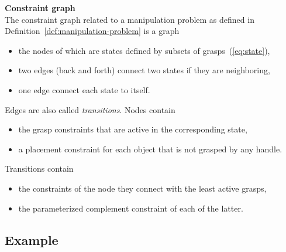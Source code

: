 \begin{definition}\label{def:constraint-graph}\textbf{Constraint graph}\\
  The constraint graph related to a manipulation problem as defined in Definition~\ref{def:manipulation-problem} is a graph
  \begin{itemize}
  \item the nodes of which are states defined by subsets of grasps~(\ref{eq:state}),
  \item two edges (back and forth) connect two states if they are neighboring,
  \item one edge connect each state to itself.
  \end{itemize}
  Edges are also called \textit{transitions}.
  Nodes contain
  \begin{itemize}
  \item the grasp constraints that are active in the corresponding state,
  \item a placement constraint for each object that is not grasped by any handle.
  \end{itemize}
  Transitions contain
  \begin{itemize}
  \item the constraints of the node they connect with the least active grasps,
  \item the parameterized complement constraint of each of the latter.
  \end{itemize}
\end{definition}

\subsection{Example}\label{subsec:ur3-cylinder}

